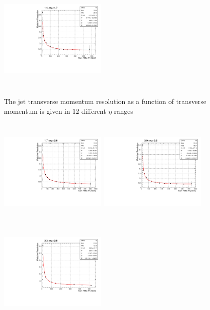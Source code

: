 \begin{figure}[!h]
  {\label{fig:fit1f}\includegraphics[width=5.3cm,height=5.3cm]{analysis_figs/eta5.pdf}} 
 \caption{ The jet transverse momentum resolution as a function of transverse momentum is given in 12 different $\eta$ ranges}
\label{fig:FIT1}
\end{figure}     

\begin{figure}[!h]
 \centering
  {\label{fig:fit2a}\includegraphics[width=5.3cm,height=5.3cm]{analysis_figs/eta6.pdf}}
  {\label{fig:fit2b}\includegraphics[width=5.3cm,height=5.3cm]{analysis_figs/eta7.pdf}} 
  {\label{fig:fit2c}\includegraphics[width=5.3cm,height=5.3cm]{analysis_figs/eta8.pdf}} \\

\end{figure}
